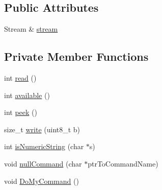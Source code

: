 \subsection*{Public Attributes}
\begin{DoxyCompactItemize}
\item 
Stream \& \mbox{\hyperlink{classyacl_lib_space_1_1yacl_lib_a4fb40a58a7acee546aee1fc4fc45403a}{stream}}
\end{DoxyCompactItemize}
\subsection*{Private Member Functions}
\begin{DoxyCompactItemize}
\item 
int \mbox{\hyperlink{classyacl_lib_space_1_1yacl_lib_a23f26c18f2e9127510b52ad6114245a6}{read}} ()
\item 
int \mbox{\hyperlink{classyacl_lib_space_1_1yacl_lib_a653154efc839c8e9e127e41347abfaf4}{available}} ()
\item 
int \mbox{\hyperlink{classyacl_lib_space_1_1yacl_lib_aafd5aeb3f3dba65fead3d7f0cbe21584}{peek}} ()
\item 
size\+\_\+t \mbox{\hyperlink{classyacl_lib_space_1_1yacl_lib_af2d480c162e7057901d046a7112cacbf}{write}} (uint8\+\_\+t b)
\item 
int \mbox{\hyperlink{classyacl_lib_space_1_1yacl_lib_a9f9863154f0212fa4bb7568cea29f681}{is\+Numeric\+String}} (char $\ast$s)
\item 
void \mbox{\hyperlink{classyacl_lib_space_1_1yacl_lib_ab0df81e79e6a6f44ba30fec8724ef7ae}{null\+Command}} (char $\ast$ptr\+To\+Command\+Name)
\item 
void \mbox{\hyperlink{classyacl_lib_space_1_1yacl_lib_a6f31fcc04bc66f08fe4a4087edd91f68}{Do\+My\+Command}} ()
\end{DoxyCompactItemize}

